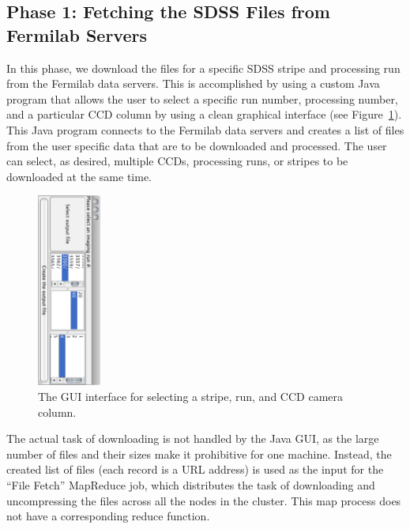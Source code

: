 \subsection{Phase 1: Fetching the SDSS Files from Fermilab Servers}
In this phase, we download the files for a specific SDSS stripe and processing run from the Fermilab data servers. This is accomplished by using a custom Java program that allows the user to select a specific run number, processing number, and a particular CCD column by using a clean graphical interface (see Figure~\ref{gui}). This Java program connects to the Fermilab data servers and creates a list of files from the user specific data that are to be downloaded and processed. The user can select, as desired, multiple CCDs, processing runs, or stripes to be downloaded at the same time.


\begin{figure}[h!]
	\vspace{0in}
	\centering
	\includegraphics[height=2.5in, angle=90]{part4/Farivar_O12/javaGui.eps}
	\caption{The GUI interface for selecting a stripe, run, and CCD camera column.}
	\label{gui}
\end{figure}



The actual task of downloading is not handled by the Java GUI, as the large number of files and their sizes make it prohibitive for one machine. Instead, the created list of files (each record is a URL address) is used as the input for the ``File Fetch'' MapReduce job, which distributes the task of downloading and uncompressing the files across all the nodes in the cluster. This map process does not have a corresponding reduce function.

